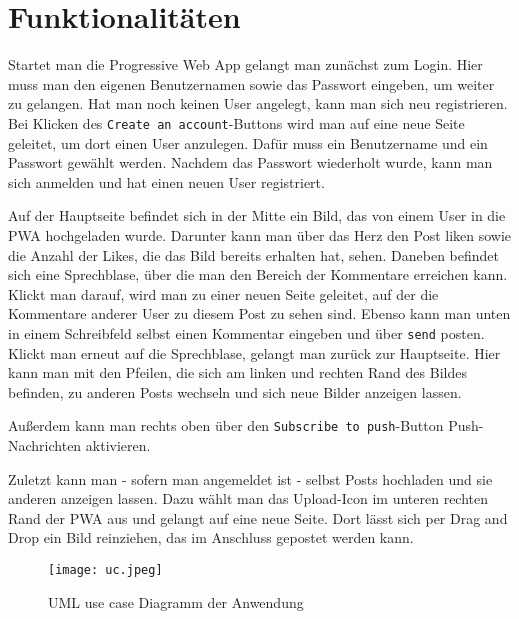 \chapter{Funktionalitäten}

Startet man die Progressive Web App gelangt man zunächst zum Login. Hier muss man den eigenen Benutzernamen sowie das Passwort eingeben, um weiter zu gelangen. Hat man noch keinen User angelegt, kann man sich neu registrieren. Bei Klicken des \texttt{Create an account}-Buttons wird man auf eine neue Seite geleitet, um dort einen User anzulegen. Dafür muss ein Benutzername und ein Passwort gewählt werden. Nachdem das Passwort wiederholt wurde, kann man sich anmelden und hat einen neuen User registriert.

Auf der Hauptseite befindet sich in der Mitte ein Bild, das von einem User in die PWA hochgeladen wurde. Darunter kann man über das Herz den Post liken sowie die Anzahl der Likes, die das Bild bereits erhalten hat, sehen. Daneben befindet sich eine Sprechblase, über die man den Bereich der Kommentare erreichen kann. Klickt man darauf, wird man zu einer neuen Seite geleitet, auf der die Kommentare anderer User zu diesem Post zu sehen sind. Ebenso kann man unten in einem Schreibfeld selbst einen Kommentar eingeben und über \texttt{send} posten. Klickt man erneut auf die Sprechblase, gelangt man zurück zur Hauptseite. Hier kann man mit den Pfeilen, die sich am linken und rechten Rand des Bildes befinden, zu anderen Posts wechseln und sich neue Bilder anzeigen lassen.

Außerdem kann man rechts oben über den \texttt{Subscribe to push}-Button Push-Nachrichten aktivieren. 

Zuletzt kann man - sofern man angemeldet ist - selbst Posts hochladen und sie anderen anzeigen lassen. Dazu wählt man das Upload-Icon im unteren rechten Rand der PWA aus und gelangt auf eine neue Seite. Dort lässt sich per Drag and Drop ein Bild reinziehen, das im Anschluss gepostet werden kann. 

\begin{figure}
    \centering
    \texttt{[image: uc.jpeg]}
    \caption{UML use case Diagramm der Anwendung}
    \label{img:uc}
\end{figure}